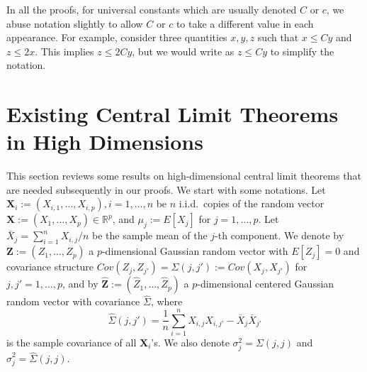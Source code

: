\documentclass[mnsc,blindrev]{informs4} %
\newcommand{\R}{\mathbb{R}}
\begin{document}
%
%
%
%
%

\ECSwitch


In all the proofs, for universal constants which are usually denoted $C$ or $c$, we abuse notation slightly to allow $C$ or $c$ to take a different value in each appearance. For example, consider three quantities $x,y,z$ such that $x\leq Cy$ and $z\leq 2x$. This implies $z\leq 2Cy$, but we would write as $z\leq Cy$ to simplify the notation.


\section{Existing Central Limit Theorems in High Dimensions}\label{sec:high-dimensional CLTs}
This section reviews some results on high-dimensional central limit theorems that are needed subsequently in our proofs.
We start with some notations. Let $\mathbf X_{i}:=(X_{i,1},\ldots,X_{i,p}), i=1,\ldots,n$ be $n$ i.i.d.~copies of the random vector $\mathbf X:=(X_1,\ldots,X_p)\in\R^p$, and $\mu_j:=E[X_j]$ for $j=1,\ldots,p$. Let $\bar{X}_j=\sum_{i=1}^nX_{i,j}/n$ be the sample mean of the $j$-th component. We denote by $\mathbf Z:=(Z_1,\ldots,Z_p)$ a $p$-dimensional Gaussian random vector with $E[Z_j]=0$ and covariance structure $Cov(Z_{j},Z_{j'})=\Sigma(j,j'):=Cov(X_{j},X_{j'})$ for $j,j'=1,\ldots,p$, and by $\widehat{\mathbf Z}:=(\widehat{Z}_1,\ldots,\widehat{Z}_p)$ a $p$-dimensional centered Gaussian random vector with covariance $\widehat{\Sigma}$, where
$$\widehat{\Sigma}(j,j')=\frac{1}{n}\sum_{i=1}^nX_{i,j}X_{i,j'}-\bar{X}_j\bar{X}_{j'}$$
is the sample covariance of all $\mathbf X_i$'s. We also denote $\sigma^2_j=\Sigma(j,j)$ and $\hat\sigma^2_j=\widehat\Sigma(j,j)$.
\end{document}
